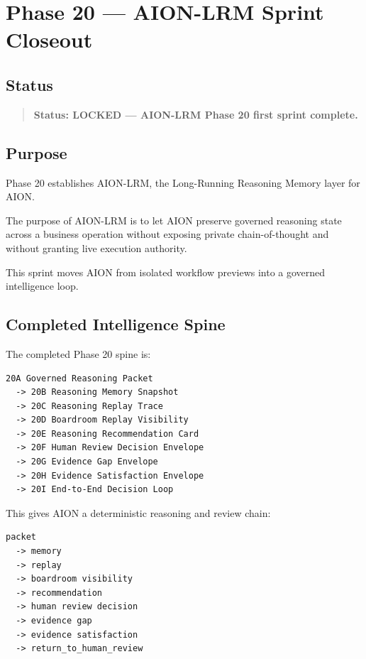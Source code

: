 \section{Phase 20 --- AION-LRM Sprint Closeout}
\label{sec:phase20-aion-lrm-sprint-closeout}

\subsection{Status}

\begin{quote}
\textbf{Status: LOCKED --- AION-LRM Phase 20 first sprint complete.}
\end{quote}

\subsection{Purpose}

Phase 20 establishes AION-LRM, the Long-Running Reasoning Memory layer for AION.

The purpose of AION-LRM is to let AION preserve governed reasoning state across a business operation without exposing private chain-of-thought and without granting live execution authority.

This sprint moves AION from isolated workflow previews into a governed intelligence loop.

\subsection{Completed Intelligence Spine}

The completed Phase 20 spine is:

\begin{verbatim}
20A Governed Reasoning Packet
  -> 20B Reasoning Memory Snapshot
  -> 20C Reasoning Replay Trace
  -> 20D Boardroom Replay Visibility
  -> 20E Reasoning Recommendation Card
  -> 20F Human Review Decision Envelope
  -> 20G Evidence Gap Envelope
  -> 20H Evidence Satisfaction Envelope
  -> 20I End-to-End Decision Loop
\end{verbatim}

This gives AION a deterministic reasoning and review chain:

\begin{verbatim}
packet
  -> memory
  -> replay
  -> boardroom visibility
  -> recommendation
  -> human review decision
  -> evidence gap
  -> evidence satisfaction
  -> return_to_human_review
\end{verbatim}

